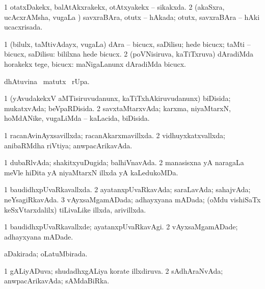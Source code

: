 {{\bentry
{} 
\gl{\gu}
\expl{}
\bmng
\bnum
\num{1} otatxDakekx, balAtAkxrakekx, otAtxyakekx -- sikakxda. 
\num{2} (akaSxra, ucAcxrAMsha, \mo vugaLa \vi) savxraBAra, otutx -- hAkada; otutx, savxraBAra -- hAki ucacxrisada. 
\enum
\emng
\eentry

\bentry
{} 
\gl{\akirx}
\bmng
\bnum
\num{1} (bilulx, taMtivAdayx, \mo vugaLa) dAra -- bicucx, saDilisu; hede bicucx; taMti -- bicucx, saDilisu:  bililxna hede bicucx. 
\num{2} (poVNisiruva, kaTiTxruva) dAradiMda horakekx tege, bicucx:  maNigaLanunx dAradiMda bicucx. 
\enum
\emng
\eentry

\bentry
{} 
\gl{\kirx}
\expl{}
\bmng
{} dhAtuvina \BU\ matutx \BUkaq\ rUpa. 
\emng
\eentry

\bentry
{} 
\gl{\gu}
\expl{}
\bmng
\bnum
\num{1} (yAvudakekxV aMTisiruvudanunx, kaTiTxhAkiruvudanunx) biDisida; mukatxvAda; beVpaRDisida. 
\num{2} savxtaMtarxvAda; karxma, niyaMtarxN, hoMdANike, \mo vugaLiMda -- kaLacida, biDisida. 
\enum
\emng
\eentry

\bentry
{} 
\gl{\gu}
\expl{}
\bmng
\bnum
\num{1} racanAvinAyxsavillxda; racanAkarxmavillxda. 
\num{2} vidhuyxkatxvallxda; anibaRMdha riVtiya; anwpacArikavAda. 
\enum
\emng
\eentry

\bentry
{} 
\gl{\gu}
\expl{}
\bmng
\bnum
\num{1} dubaRlvAda; shakitxyuDugida; balhiVnavAda. 
\num{2} manasisxna yA naragaLa meVle hiDita yA niyaMtarxN illxda yA kaLedukoMDa. 
\enum
\emng
\eentry

\bentry
{} 
\gl{\gu}
\expl{}
\bmng
\bnum
\num{1} baudidhxpUvaRkavallxda. 
\num{2} ayatanxpUvaRkavAda; saraLavAda; sahajvAda; neYsagiRkavAda. 
\num{3} vAyxsaMgamADada; adhayxyana mADada; (oMdu vishiSaTx keSxVtarxdalilx) tiLivaLike illxda, arivillxda. 
\enum
\emng
\eentry

\bentry
{} 
\gl{\kirxvi}
\bmng
\bnum
\num{1} baudidhxpUvaRkavallxde; ayatanxpUvaRkavAgi. 
\num{2} vAyxsaMgamADade; adhayxyana mADade. 
\enum
\emng
\eentry

\bentry
{} 
\gl{\gu}
\expl{}
\bmng
aDakirada; oLatuMbirada. 
\emng
\eentry

\bentry
{} 
\gl{\gu}
\expl{}
\bmng
\bnum
\num{1} gALiyADuva; shudadhxgALiya korate illxdiruva. 
\num{2} sAdhAraNvAda; anwpacArikavAda; sAMdaBiRka. 
\enum
\emng
\eentry

}}
